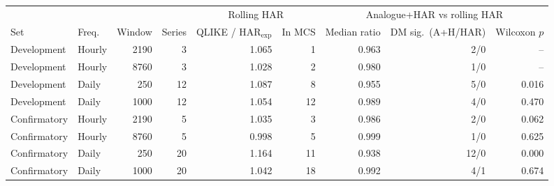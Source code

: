 \begin{tabular}{llrrrrrrr}
\toprule
& & & & \multicolumn{2}{c}{Rolling HAR} & \multicolumn{3}{c}{Analogue+HAR vs rolling HAR} \\
\cmidrule(lr){5-6}\cmidrule(lr){7-9}
Set & Freq. & Window & Series & QLIKE / HAR$_{\text{exp}}$ & In MCS & Median ratio & DM sig.\ (A+H/HAR) & Wilcoxon $p$ \\
\midrule
Development & Hourly & 2190 & 3 & 1.065 & 1 & 0.963 & 2/0 & --\\
Development & Hourly & 8760 & 3 & 1.028 & 2 & 0.980 & 1/0 & --\\
Development & Daily & 250 & 12 & 1.087 & 8 & 0.955 & 5/0 & 0.016\\
Development & Daily & 1000 & 12 & 1.054 & 12 & 0.989 & 4/0 & 0.470\\
Confirmatory & Hourly & 2190 & 5 & 1.035 & 3 & 0.986 & 2/0 & 0.062\\
Confirmatory & Hourly & 8760 & 5 & 0.998 & 5 & 0.999 & 1/0 & 0.625\\
Confirmatory & Daily & 250 & 20 & 1.164 & 11 & 0.938 & 12/0 & 0.000\\
Confirmatory & Daily & 1000 & 20 & 1.042 & 18 & 0.992 & 4/1 & 0.674\\
\bottomrule
\end{tabular}
